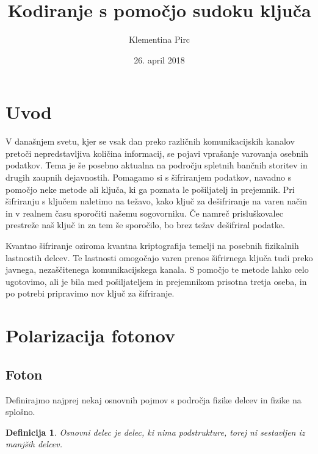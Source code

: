 \documentclass[A4paper, 11pt]{article}
\title{Kodiranje s pomočjo sudoku ključa}
\author{Klementina Pirc}
\affil{Fakulteta za matematiko in fiziko \\ Oddelek za matematiko}
\date{26. april 2018}
\newtheorem{definicija}{Definicija}
\begin{document}
\begin{titlepage} 

\maketitle
\thispagestyle{empty}
	
\end{titlepage}



\section{Uvod}

V današnjem svetu, kjer se vsak dan preko različnih komunikacijskih kanalov pretoči nepredstavljiva količina informacij, se pojavi vprašanje varovanja osebnih podatkov. Tema je še posebno aktualna na področju spletnih bančnih storitev in drugih zaupnih dejavnostih. Pomagamo si s šifriranjem podatkov, navadno s pomočjo neke metode ali ključa, ki ga poznata le pošiljatelj in prejemnik. Pri šifriranju s ključem naletimo na težavo, kako ključ za dešifriranje na varen način in v realnem času sporočiti našemu sogovorniku. Če namreč prisluškovalec prestreže naš ključ in za tem še sporočilo, bo brez težav dešifriral podatke.

Kvantno šifriranje oziroma kvantna kriptografija temelji na posebnih fizikalnih lastnostih delcev. Te lastnosti omogočajo varen prenos šifrirnega ključa tudi preko javnega, nezaščitenega komunikacijskega kanala. S pomočjo te metode lahko celo ugotovimo, ali je bila med pošiljateljem in prejemnikom prisotna tretja oseba, in po potrebi pripravimo nov ključ za šifriranje.



\section{Polarizacija fotonov}

\subsection{Foton}

Definirajmo najprej nekaj osnovnih pojmov s področja fizike delcev in fizike na splošno.

\begin{definicija}
Osnovni delec je delec, ki nima podstrukture, torej ni sestavljen iz manjših delcev.
\end{definicija}
\end{document}
